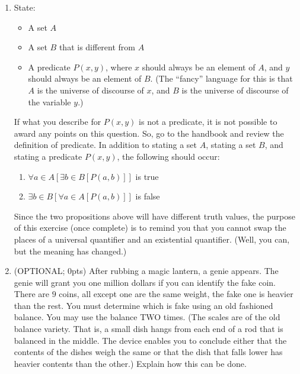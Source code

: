 \documentclass{article}
\begin{document}
\begin{enumerate}
      \item State:
            \begin{itemize}
                  \item A set $A$
                  \item A set $B$ that is different from $A$
                  \item A predicate $P(x,y)$, where $x$ should always be an element of $A$, and $y$
                        should always be an element of $B$. (The ``fancy'' language for this is that
                        $A$ is the universe of discourse of $x$, and $B$ is the universe of discourse
                        of the variable $y$.)
            \end{itemize}
            If what you describe for $P(x,y)$ is not a predicate, it is not possible to award any points on this question. So, go to the handbook and review the definition of predicate. In addition to stating a set $A$, stating a set $B$, and stating a predicate $P(x,y)$, the following should occur:
            \begin{enumerate}
                  \item $\forall a \in A [ \exists b \in B [ P(a,b) ] ]$ is true
                  \item $\exists b \in B [ \forall a \in A [ P(a,b) ] ]$ is false
            \end{enumerate}
            Since the two propositions above will have different truth values, the purpose of this exercise (once complete) is to remind you that you cannot swap the places of a universal quantifier and an existential quantifier. (Well, you can, but the meaning has changed.)

      \item (OPTIONAL; 0pts) After rubbing a magic lantern, a genie appears. The genie will grant you one million dollars if you can identify the fake coin. There are $9$ coins, all except one are the same weight, the fake one is heavier than the rest. You must determine which is fake using an old fashioned balance. You may use the balance TWO times. (The scales are of the old balance variety. That is, a small dish hangs from each end of a rod that is balanced in the middle. The device enables you to conclude either that the contents of the dishes weigh the same or that the dish that falls lower has heavier contents than the other.) Explain how this can be done.

\end{enumerate}
\end{document}
